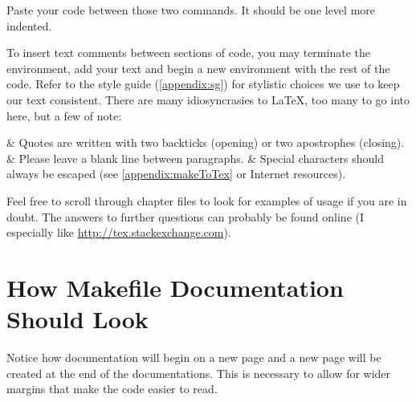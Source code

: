Paste your code between those two commands. It should be one level more indented.

To insert text comments between sections of code, you may terminate the environment, add your text and begin a new environment with the rest of the code. Refer to the style guide (\autoref{appendix:sg}) for stylistic choices we use to keep our text consistent. There are many idiosyncrasies to \LaTeX, too many to go into here, but a few of note:

\begin{easylist}[itemize]
	& Quotes are written with two backticks (opening) or two apostrophes (closing).
	& Please leave a blank line between paragraphs. 
	& Special characters should always be escaped (see \autoref{appendix:makeToTex} or Internet resources).
\end{easylist}

Feel free to scroll through chapter files to look for examples of usage if you are in doubt. The answers to further questions can probably be found online (I especially like \url{http://tex.stackexchange.com}).

\section{How Makefile Documentation Should Look}

Notice how documentation will begin on a new page and a new page will be created at the end of the documentations. This is necessary to allow for wider margins that make the code easier to read.



